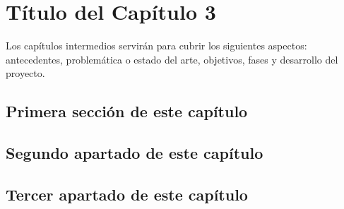 \chapter{Título del Capítulo 3}
\label{ch:tres}

\noindent Los capítulos intermedios servirán para cubrir los siguientes aspectos: antecedentes, problemática o estado del arte, objetivos, fases y desarrollo del proyecto.

\section{Primera sección de este capítulo}

\noindent \lipsum[-2]

\section{Segundo apartado de este capítulo}

\noindent \lipsum[3]

\section{Tercer apartado de este capítulo}

\noindent \lipsum[4]